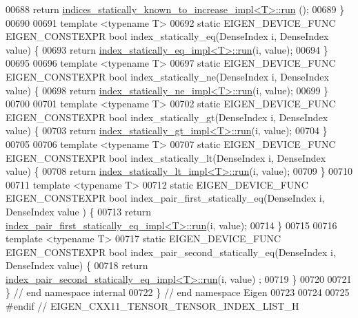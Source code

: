 \begin{DoxyCode}
00688   \textcolor{keywordflow}{return} \hyperlink{struct_eigen_1_1internal_1_1indices__statically__known__to__increase__impl}{indices\_statically\_known\_to\_increase\_impl<T>::run}
      ();
00689 \}
00690 
00691 \textcolor{keyword}{template} <\textcolor{keyword}{typename} T>
00692 \textcolor{keyword}{static} EIGEN\_DEVICE\_FUNC EIGEN\_CONSTEXPR \textcolor{keywordtype}{bool} index\_statically\_eq(DenseIndex i, DenseIndex value) \{
00693   \textcolor{keywordflow}{return} \hyperlink{struct_eigen_1_1internal_1_1index__statically__eq__impl}{index\_statically\_eq\_impl<T>::run}(i, value);
00694 \}
00695 
00696 \textcolor{keyword}{template} <\textcolor{keyword}{typename} T>
00697 \textcolor{keyword}{static} EIGEN\_DEVICE\_FUNC EIGEN\_CONSTEXPR \textcolor{keywordtype}{bool} index\_statically\_ne(DenseIndex i, DenseIndex value) \{
00698   \textcolor{keywordflow}{return} \hyperlink{struct_eigen_1_1internal_1_1index__statically__ne__impl}{index\_statically\_ne\_impl<T>::run}(i, value);
00699 \}
00700 
00701 \textcolor{keyword}{template} <\textcolor{keyword}{typename} T>
00702 \textcolor{keyword}{static} EIGEN\_DEVICE\_FUNC EIGEN\_CONSTEXPR \textcolor{keywordtype}{bool} index\_statically\_gt(DenseIndex i, DenseIndex value) \{
00703   \textcolor{keywordflow}{return} \hyperlink{struct_eigen_1_1internal_1_1index__statically__gt__impl}{index\_statically\_gt\_impl<T>::run}(i, value);
00704 \}
00705 
00706 \textcolor{keyword}{template} <\textcolor{keyword}{typename} T>
00707 \textcolor{keyword}{static} EIGEN\_DEVICE\_FUNC EIGEN\_CONSTEXPR \textcolor{keywordtype}{bool} index\_statically\_lt(DenseIndex i, DenseIndex value) \{
00708   \textcolor{keywordflow}{return} \hyperlink{struct_eigen_1_1internal_1_1index__statically__lt__impl}{index\_statically\_lt\_impl<T>::run}(i, value);
00709 \}
00710 
00711 \textcolor{keyword}{template} <\textcolor{keyword}{typename} T>
00712 \textcolor{keyword}{static} EIGEN\_DEVICE\_FUNC EIGEN\_CONSTEXPR \textcolor{keywordtype}{bool} index\_pair\_first\_statically\_eq(DenseIndex i, DenseIndex value
      ) \{
00713   \textcolor{keywordflow}{return} \hyperlink{struct_eigen_1_1internal_1_1index__pair__first__statically__eq__impl}{index\_pair\_first\_statically\_eq\_impl<T>::run}(i, value);
00714 \}
00715 
00716 \textcolor{keyword}{template} <\textcolor{keyword}{typename} T>
00717 \textcolor{keyword}{static} EIGEN\_DEVICE\_FUNC EIGEN\_CONSTEXPR \textcolor{keywordtype}{bool} index\_pair\_second\_statically\_eq(DenseIndex i, DenseIndex 
      value) \{
00718   \textcolor{keywordflow}{return} \hyperlink{struct_eigen_1_1internal_1_1index__pair__second__statically__eq__impl}{index\_pair\_second\_statically\_eq\_impl<T>::run}(i, value)
      ;
00719 \}
00720 
00721 \}  \textcolor{comment}{// end namespace internal}
00722 \}  \textcolor{comment}{// end namespace Eigen}
00723 
00724 
00725 \textcolor{preprocessor}{#endif // EIGEN\_CXX11\_TENSOR\_TENSOR\_INDEX\_LIST\_H}
\end{DoxyCode}
